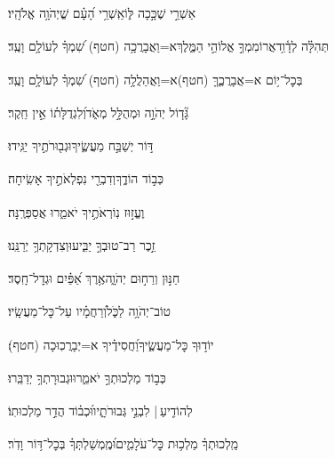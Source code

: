 \documentclass[12pt]{article}
\newcommand{\loc}[1]{\textsuperscript{\locf{#1}}}
\begin{document}
{\loc{ טו}~}‏אַשְׁרֵ֣י  שֶׁכָּ֣כָה לּ֑וֹ{\hfill}אַֽשְׁרֵ֥י הָ֝עָ֗ם שֱׁיְהֹוָ֥ה אֱלֹהָֽיו׃\par\pend
\ledpb
\pstart[\subsection*{\textcolor{red}{פרק קמה}}]\label{פרק קמה}
{\loc{ א}~}‏תְּהִלָּ֗ה לְדָ֫וִ֥ד\newline\hspace*{.5em}אֲרוֹמִמְךָ֣ אֱלוֹהַ֣י הַמֶּ֑לֶךְ{\hfill}א=וַאֲבָרֲכָ֥ה (חטף) שִׁ֝מְךָ֗ לְעוֹלָ֥ם וָעֶֽד׃\par

{\loc{ ב}~}‏בְּכׇל־י֥וֹם א=אֲבָרֲכֶ֑ךָּ (חטף){\hfill}א=וַאֲהַלֲלָ֥ה (חטף) שִׁ֝מְךָ֗ לְעוֹלָ֥ם וָעֶֽד׃\par

{\loc{ ג}~}‏גָּ֘ד֤וֹל יְהֹוָ֣ה וּמְהֻלָּ֣ל מְאֹ֑ד{\hfill}וְ֝לִגְדֻלָּת֗וֹ אֵ֣ין חֵֽקֶר׃\par

{\loc{ ד}~}‏דּ֣וֹר  יְשַׁבַּ֣ח מַעֲשֶׂ֑יךָ{\hfill}וּגְב֖וּרֹתֶ֣יךָ יַגִּֽידוּ׃\par

{\loc{ ה}~}‏ כְּב֣וֹד הוֹדֶ֑ךָ{\hfill}וְדִבְרֵ֖י נִפְלְאֹתֶ֣יךָ אָשִֽׂיחָה׃\par

{\loc{ ו}~}‏וֶעֱז֣וּז נֽוֹרְאֹתֶ֣יךָ יֹאמֵ֑רוּ{\hfill} אֲסַפְּרֶֽנָּה׃\par

{\loc{ ז}~}‏זֵ֣כֶר רַב־טוּבְךָ֣ יַבִּ֑יעוּ{\hfill}וְצִדְקָתְךָ֥ יְרַנֵּֽנוּ׃\par

{\loc{ ח}~}‏חַנּ֣וּן וְרַח֣וּם יְהֹוָ֑ה{\hfill}אֶ֥רֶךְ אַ֝פַּ֗יִם וּגְדׇל־חָֽסֶד׃\par

{\loc{ ט}~}‏טוֹב־יְהֹוָ֥ה לַכֹּ֑ל{\hfill}וְ֝רַחֲמָ֗יו עַל־כׇּל־מַעֲשָֽׂיו׃\par

{\loc{ י}~}‏יוֹד֣וּךָ  כׇּל־מַעֲשֶׂ֑יךָ{\hfill}וַ֝חֲסִידֶ֗יךָ א=יְבָרֲכֽוּכָה (חטף)׃\par

{\loc{ יא}~}‏כְּב֣וֹד מַלְכוּתְךָ֣ יֹאמֵ֑רוּ{\hfill}וּגְבוּרָתְךָ֥ יְדַבֵּֽרוּ׃\par

{\loc{ יב}~}‏לְהוֹדִ֤יעַ |  לִבְנֵ֣י  גְּבוּרֹתָ֑יו{\hfill}וּ֝כְב֗וֹד הֲדַ֣ר מַלְכוּתֽוֹ׃\par

{\loc{ יג}~}‏מַֽלְכוּתְךָ֗ מַלְכ֥וּת כׇּל־עֹלָמִ֑ים{\hfill}וּ֝מֶֽמְשַׁלְתְּךָ֗ בְּכׇל־דּ֥וֹר וָדֹֽר׃\par
\end{document}
